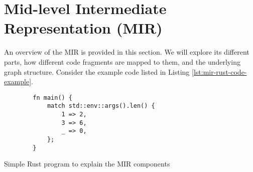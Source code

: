 \documentclass[../Thesis.tex]{subfiles}
\begin{document}
\section{Mid-level Intermediate Representation (MIR)}

An overview of the \acrfull{MIR} is provided in this section.
We will explore its different parts,
how different code fragments are mapped to them,
and the underlying graph structure.
Consider the example code listed in Listing \ref{lst:mir-rust-code-example}.

\begin{listing}
    \begin{verbatim}
        fn main() {
            match std::env::args().len() {
                1 => 2,
                3 => 6,
                _ => 0,
            };
        }
    \end{verbatim}
    \caption{Simple Rust program to explain the MIR components}
    \label{lst:mir-rust-code-example}
\end{listing}
\end{document}
